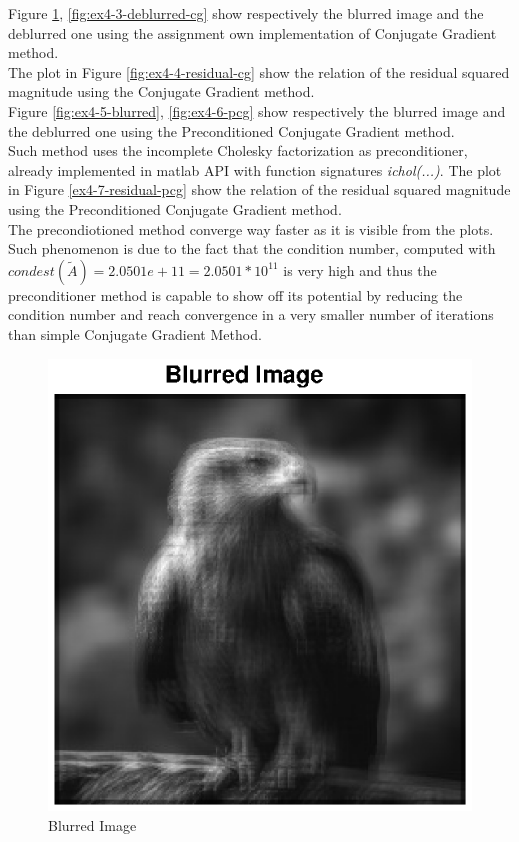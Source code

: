 \documentclass[unicode,11pt,a4paper,oneside,numbers=endperiod,openany]{scrartcl}
\begin{document}
Figure \ref{fig:ex4-1-blurred}, \ref{fig:ex4-3-deblurred-cg} show respectively the blurred image
and the deblurred one using the assignment own implementation of Conjugate Gradient method.\\
The plot in Figure \ref{fig:ex4-4-residual-cg} show the relation of the residual squared magnitude using the
Conjugate Gradient method.\\

Figure \ref{fig:ex4-5-blurred}, \ref{fig:ex4-6-pcg} show respectively the blurred image
and the deblurred one using the Preconditioned Conjugate Gradient method.\\
Such method uses the incomplete Cholesky factorization as preconditioner, already implemented in matlab API
with function signatures \textit{ichol(...)}.
The plot in Figure \ref{ex4-7-residual-pcg} show the relation of the residual squared magnitude using the
Preconditioned Conjugate Gradient method.\\

The precondiotioned method converge way faster as it is visible from the plots.
Such phenomenon is due to the fact that the condition number, computed with
$condest(\tilde{A}) = 2.0501e+11 = 2.0501 * 10^{11}$
is very high and thus the preconditioner method is capable to show off its potential by reducing
the condition number and reach convergence in a very smaller number of iterations than simple
Conjugate Gradient Method.

\begin{figure}[H]
    \centering
    \caption{Blurred Image}
    \label{fig:ex4-1-blurred}
    \includegraphics[width=\textwidth, trim={0cm 0cm 0cm 0cm}, clip]{./figures/ex4-1-blurred.eps}
\end{figure}
\end{document}
